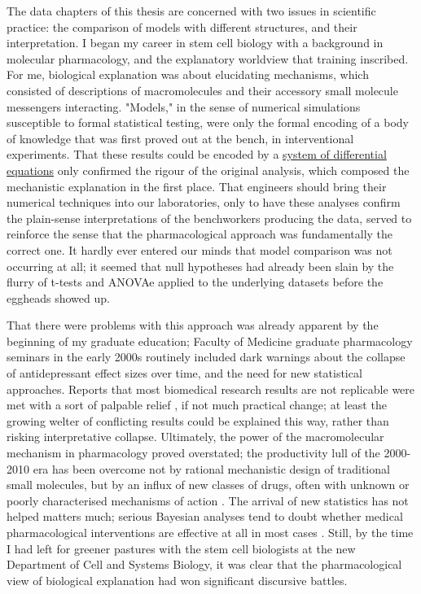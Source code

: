 \documentclass{ut-thesis}
\begin{document}
\begin{NoHyper}
The data chapters of this thesis are concerned with two issues in scientific practice: the comparison of models with different structures, and their interpretation. I began my career in stem cell biology with a background in molecular pharmacology, and the explanatory worldview that training inscribed. For me, biological explanation was about elucidating mechanisms, which consisted of descriptions of macromolecules and their accessory small molecule messengers interacting. "Models," in the sense of numerical simulations susceptible to formal statistical testing, were only the formal encoding of a body of knowledge that was first proved out at the bench, in interventional experiments. That these results could be encoded by a \hyperref[ssec:SODE]{system of differential equations} only confirmed the rigour of the original analysis, which composed the mechanistic explanation in the first place. That engineers should bring their numerical techniques into our laboratories, only to have these analyses confirm the plain-sense interpretations of the benchworkers producing the data, served to reinforce the sense that the pharmacological approach was fundamentally the correct one. It hardly ever entered our minds that model comparison was not occurring at all; it seemed that null hypotheses had already been slain by the flurry of t-tests and ANOVAe applied to the underlying datasets before the eggheads showed up.

That there were problems with this approach was already apparent by the beginning of my graduate education; Faculty of Medicine graduate pharmacology seminars in the early 2000s routinely included dark warnings about the collapse of antidepressant effect sizes over time, and the need for new statistical approaches. Reports that most biomedical research results are not replicable were met with a sort of palpable relief \cite{Ioannidis2005}, if not much practical change; at least the growing welter of conflicting results could be explained this way, rather than risking interpretative collapse. Ultimately, the power of the macromolecular mechanism in pharmacology proved overstated; the productivity lull of the 2000-2010 era has been overcome not by rational mechanistic design of traditional small molecules, but by an influx of new classes of drugs, often with unknown or poorly characterised mechanisms of action \cite{Munos2019}. The arrival of new statistics has not helped matters much; serious Bayesian analyses tend to doubt whether medical pharmacological interventions are effective at all in most cases \cite{Stegenga2018}. Still, by the time I had left for greener pastures with the stem cell biologists at the new Department of Cell and Systems Biology, it was clear that the pharmacological view of biological explanation had won significant discursive battles.


\end{NoHyper}
\end{document}
